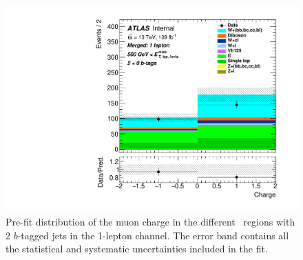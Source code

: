 \begin{figure}[!htb]
  \includegraphics[width=0.46\linewidth]{chapters/c9/figures/Region_BMin500_incFat1_Fat1_incJet1_Y2015_DCR1_T20_L1_distCharge_J0_Prefit.pdf}
\caption{Pre-fit distribution of the muon charge in the different \met~regions with \\2 $b$-tagged jets in the 1-lepton channel. The error band contains all the statistical and systematic uncertainties included in the fit.}
\label{fig:Data_MC_CR1_mu_charge_2b}
\end{figure}
